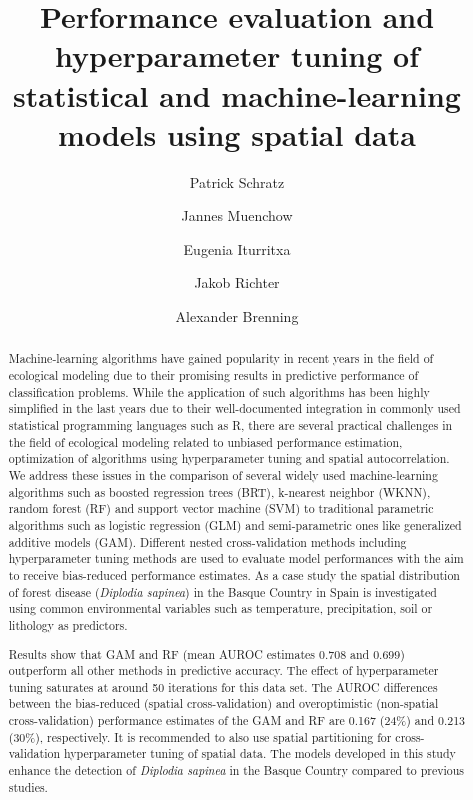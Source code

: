 \documentclass[review]{elsarticle}
\begin{document}
\begin{frontmatter}

	\title{Performance evaluation and hyperparameter tuning of statistical and machine-learning models using spatial data}

	\author[FSU]{Patrick Schratz}

	\author[FSU]{Jannes Muenchow}
	\author[NEIKER]{Eugenia Iturritxa}
	\author[TUDO]{Jakob Richter}
	\author[FSU]{Alexander Brenning}

	\address[FSU]{Department of Geography, GIScience group, Grietgasse 6, 07743, Jena, Germany}
	\address[NEIKER]{NEIKER, Granja Modelo –Arkaute, Apdo. 46, 01080 Vitoria-Gasteiz, Arab, Spain}
	\address[TUDO]{Department of Statistics, TU Dortmund University, Germany}

	\begin{abstract}
		Machine-learning algorithms have gained popularity in recent years in the field of ecological modeling due to their promising results in predictive performance of classification problems.
		While the application of such algorithms has been highly simplified in the last years due to their well-documented integration in commonly used statistical programming languages such as R, there are several practical challenges in the field of ecological modeling related to unbiased performance estimation, optimization of algorithms using hyperparameter tuning and spatial autocorrelation.
		We address these issues in the comparison of several widely used machine-learning algorithms such as boosted regression trees (BRT), k-nearest neighbor (WKNN), random forest (RF) and support vector machine (SVM) to traditional parametric algorithms such as logistic regression (GLM) and semi-parametric ones like generalized additive models (GAM).
		Different nested cross-validation methods including hyperparameter tuning methods are used to evaluate model performances with the aim to receive bias-reduced performance estimates.
		As a case study the spatial distribution of forest disease (\textit{Diplodia sapinea}) in the Basque Country in Spain is investigated using common environmental variables such as temperature, precipitation, soil or lithology as predictors.

		Results show that GAM and \ac{RF} (mean AUROC estimates 0.708 and 0.699) outperform all other methods in predictive accuracy.
		The effect of hyperparameter tuning saturates at around 50 iterations for this data set.
		The AUROC differences between the bias-reduced (spatial cross-validation) and overoptimistic (non-spatial cross-validation) performance estimates of the GAM and RF are 0.167 (24\%) and 0.213 (30\%), respectively.
		It is recommended to also use spatial partitioning for cross-validation hyperparameter tuning of spatial data.
		The models developed in this study enhance the detection of \textit{Diplodia sapinea} in the Basque Country compared to previous studies.
	\end{abstract}


\end{frontmatter}
\end{document}
